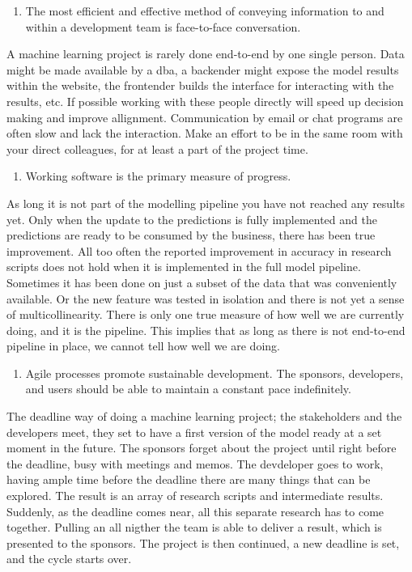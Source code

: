\documentclass[]{book}
\providecommand{\tightlist}{%
  \setlength{\itemsep}{0pt}\setlength{\parskip}{0pt}}
\begin{document}
\begin{enumerate}
\def\labelenumi{\arabic{enumi})}
\setcounter{enumi}{5}
\tightlist
\item
  The most efficient and effective method of conveying information to and within a development team is face-to-face conversation.
\end{enumerate}

A machine learning project is rarely done end-to-end by one single person. Data might be made available by a dba, a backender might expose the model results within the website, the frontender builds the interface for interacting with the results, etc. If possible working with these people directly will speed up decision making and improve allignment. Communication by email or chat programs are often slow and lack the interaction. Make an effort to be in the same room with your direct colleagues, for at least a part of the project time.

\begin{enumerate}
\def\labelenumi{\arabic{enumi})}
\setcounter{enumi}{6}
\tightlist
\item
  Working software is the primary measure of progress.
\end{enumerate}

As long it is not part of the modelling pipeline you have not reached any results yet. Only when the update to the predictions is fully implemented and the predictions are ready to be consumed by the business, there has been true improvement. All too often the reported improvement in accuracy in research scripts does not hold when it is implemented in the full model pipeline. Sometimes it has been done on just a subset of the data that was conveniently available. Or the new feature was tested in isolation and there is not yet a sense of multicollinearity. There is only one true measure of how well we are currently doing, and it is the pipeline. This implies that as long as there is not end-to-end pipeline in place, we cannot tell how well we are doing.

\begin{enumerate}
\def\labelenumi{\arabic{enumi})}
\setcounter{enumi}{7}
\tightlist
\item
  Agile processes promote sustainable development. The sponsors, developers, and users should be able to maintain a constant pace indefinitely.
\end{enumerate}

The deadline way of doing a machine learning project; the stakeholders and the developers meet, they set to have a first version of the model ready at a set moment in the future. The sponsors forget about the project until right before the deadline, busy with meetings and memos. The devdeloper goes to work, having ample time before the deadline there are many things that can be explored. The result is an array of research scripts and intermediate results. Suddenly, as the deadline comes near, all this separate research has to come together. Pulling an all nigther the team is able to deliver a result, which is presented to the sponsors. The project is then continued, a new deadline is set, and the cycle starts over.
\end{document}
